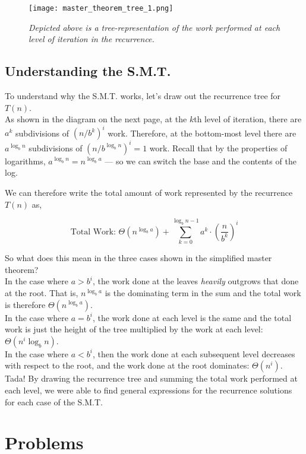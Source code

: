 \begin{figure}[ht]
    \centering
    \texttt{[image: master\_theorem\_tree\_1.png]}
    \caption*{\textit{Depicted above is a tree-representation of the work performed at each level of iteration in the recurrence.}}
\end{figure}

\subsection*{Understanding the S.M.T.}

To understand why the S.M.T. works, let's draw out the recurrence tree for $T(n)$. \\

As shown in the diagram on the next page, at the $k$th level of iteration, there are $a^k$ subdivisions of $(n/b^k)^i$ work. Therefore, at the bottom-most level there are $a^{\log_b n}$ subdivisions of $(n/b^{\log_b n})^i = 1$ work. Recall that by the properties of logarithms, $a^{\log_b n} = n^{\log_b a}$ --- so we can switch the base and the contents of the log.

We can therefore write the total amount of work represented by the recurrence $T(n)$ as,

$$\text{Total Work: }\Theta(n^{\log_b a}) + \sum_{k=0}^{\log_b{n-1}} a^k\cdot (\frac{n}{b^k})^i$$

So what does this mean in the three cases shown in the simplified master theorem?\\

In the case where $a > b^i$, the work done at the leaves \textit{heavily} outgrows that done at the root. That is, $n^{\log_b a}$ is the dominating term in the sum and the total work is therefore $\Theta(n^{\log_b a})$.\\

In the case where $a = b^i$, the work done at each level is the same and the total work is just the height of the tree multiplied by the work at each level: $\Theta(n^i \log_b n)$.\\

In the case where $a < b^i$, then the work done at each subsequent level decreases with respect to the root, and the work done at the root dominates: $\Theta(n^i)$.\\

Tada! By drawing the recurrence tree and summing the total work performed at each level, we were able to find general expressions for the recurrence solutions for each case of the S.M.T.
\section*{Problems}

